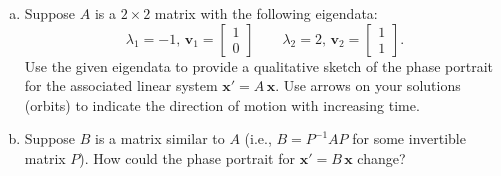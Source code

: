 \documentclass[11pt,letterpaper,boxed]{pset}
\begin{document}
    
    \begin{problem} [Exercise 1.]
        \begin{enumerate} [(a)]
            \item Suppose $A$ is a $2 \times 2$ matrix with the following eigendata:
             \[ \lambda_1 = -1, \, \mathbf{v}_1=  \begin{bmatrix} 1 \\ 0 \end{bmatrix}
             \qquad \lambda_2=2, \, \mathbf{v}_2=  \begin{bmatrix} 1 \\ 1 \end{bmatrix}. \]
            Use the given eigendata to provide a qualitative sketch of the phase portrait for the associated linear system $\mathbf{x}' = A \, \mathbf{x}$.  Use arrows on your solutions (orbits) to indicate the direction of motion with increasing time. 
            \item Suppose $B$ is a matrix similar to $A$ (i.e., $B=P^{-1} A P$ for some invertible matrix $P$). How could the phase portrait for $\mathbf{x}' = B \, \mathbf{x}$ change? 
        \end{enumerate}
    \end{problem}
    \newpage
    
\end{document}

